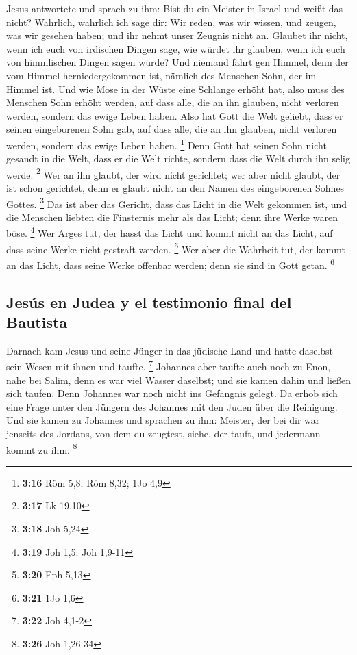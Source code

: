  Jesus antwortete und sprach zu ihm: Bist du ein Meister
in Israel und weißt das nicht?  Wahrlich, wahrlich ich
sage dir: Wir reden, was wir wissen, und zeugen, was wir gesehen haben;
und ihr nehmt unser Zeugnis nicht an.  Glaubet ihr nicht,
wenn ich euch von irdischen Dingen sage, wie würdet ihr glauben, wenn
ich euch von himmlischen Dingen sagen würde?  Und niemand
fährt gen Himmel, denn der vom Himmel herniedergekommen ist, nämlich des
Menschen Sohn, der im Himmel ist.  Und wie Mose in der
Wüste eine Schlange erhöht hat, also muss des Menschen Sohn erhöht
werden,  auf dass alle, die an ihn glauben, nicht
verloren werden, sondern das ewige Leben haben.  Also hat
Gott die Welt geliebt, dass er seinen eingeborenen Sohn gab, auf dass
alle, die an ihn glauben, nicht verloren werden, sondern das ewige Leben
haben. \footnote{\textbf{3:16} Röm 5,8; Röm 8,32; 1Jo 4,9}
 Denn Gott hat seinen Sohn nicht gesandt in die Welt,
dass er die Welt richte, sondern dass die Welt durch ihn selig werde.
\footnote{\textbf{3:17} Lk 19,10}  Wer an ihn glaubt, der
wird nicht gerichtet; wer aber nicht glaubt, der ist schon gerichtet,
denn er glaubt nicht an den Namen des eingeborenen Sohnes Gottes.
\footnote{\textbf{3:18} Joh 5,24}  Das ist aber das
Gericht, dass das Licht in die Welt gekommen ist, und die Menschen
liebten die Finsternis mehr als das Licht; denn ihre Werke waren böse.
\footnote{\textbf{3:19} Joh 1,5; Joh 1,9-11}  Wer Arges
tut, der hasst das Licht und kommt nicht an das Licht, auf dass seine
Werke nicht gestraft werden. \footnote{\textbf{3:20} Eph 5,13}
 Wer aber die Wahrheit tut, der kommt an das Licht, dass
seine Werke offenbar werden; denn sie sind in Gott getan. \footnote{\textbf{3:21}
  1Jo 1,6}

\hypertarget{jesuxfas-en-judea-y-el-testimonio-final-del-bautista}{%
\subsection{Jesús en Judea y el testimonio final del
Bautista}\label{jesuxfas-en-judea-y-el-testimonio-final-del-bautista}}

 Darnach kam Jesus und seine Jünger in das jüdische Land
und hatte daselbst sein Wesen mit ihnen und taufte. \footnote{\textbf{3:22}
  Joh 4,1-2}  Johannes aber taufte auch noch zu Enon,
nahe bei Salim, denn es war viel Wasser daselbst; und sie kamen dahin
und ließen sich taufen.  Denn Johannes war noch nicht ins
Gefängnis gelegt.  Da erhob sich eine Frage unter den
Jüngern des Johannes mit den Juden über die Reinigung. 
Und sie kamen zu Johannes und sprachen zu ihm: Meister, der bei dir war
jenseits des Jordans, von dem du zeugtest, siehe, der tauft, und
jedermann kommt zu ihm. \footnote{\textbf{3:26} Joh 1,26-34}

